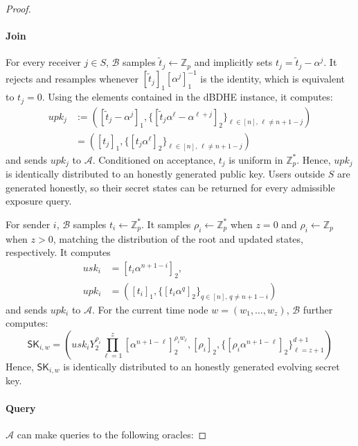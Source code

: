 \documentclass[sigconf,anonymous]{acmart}
\theoremstyle{definition}
\theoremstyle{definition}
\theoremstyle{definition}
\theoremstyle{definition}
\theoremstyle{definition}
\theoremstyle{definition}
\theoremstyle{definition}
\theoremstyle{definition}
\theoremstyle{definition}
\begin{document}
\begin{proof}
	\paragraph{\textbf{Join}}
	For every receiver $j\in S$, $\mathcal{B}$ samples
	$\widetilde{t}_j\leftarrow\mathbb{Z}_p$ and implicitly sets
	$t_j=\widetilde{t}_j-\alpha^j$. It rejects and resamples whenever
	$[\widetilde t_j]_1[\alpha^j]_1^{-1}$ is the identity, which is
	equivalent to $t_j=0$.
	Using the elements contained in the dBDHE instance, it computes:
	\begin{equation*}
		\begin{split}
			upk_j
			&:=
			\left(
			[\widetilde{t}_j-\alpha^j]_1,
			\{
			[\widetilde{t}_j\alpha^\ell-\alpha^{\ell+j}]_2
			\}_{\ell\in[n],\,\ell\neq n+1-j}
			\right)
			\\
			&=
			\left(
			[t_j]_1,
			\{
			[t_j\alpha^\ell]_2
			\}_{\ell\in[n],\,\ell\neq n+1-j}
			\right)
		\end{split}
	\end{equation*}
	and sends $upk_j$ to $\mathcal{A}$.
	Conditioned on acceptance, $t_j$ is uniform in $\mathbb{Z}_p^*$.
	Hence, $upk_j$ is identically distributed to an honestly generated
	public key. Users outside $S$ are generated honestly, so their secret
	states can be returned for every admissible exposure query.
	
	For sender $i$, $\mathcal{B}$ samples $t_i\leftarrow\mathbb{Z}_p^{*}$.
	It samples $\rho_i\leftarrow\mathbb{Z}_p^*$ when $z=0$ and
	$\rho_i\leftarrow\mathbb{Z}_p$ when $z>0$, matching the distribution
	of the root and updated states, respectively.
	It computes
	\[
	\begin{aligned}
	usk_i&=[t_i\alpha^{n+1-i}]_2,\\
	upk_i&=\left([t_i]_1,
	\{[t_i\alpha^q]_2\}_{q\in[n],\,q\neq n+1-i}\right)
	\end{aligned}
	\]
	and sends $upk_i$ to $\mathcal{A}$.
	For the current time node $w=(w_1,\ldots,w_z)$,
	$\mathcal{B}$ further computes:
	\[
	\mathsf{SK}_{i,w}
	=
	\left(
	usk_iY_2^{\rho_i}
	\prod_{\ell=1}^{z}
	[\alpha^{n+1-\ell}]_2^{\rho_iw_\ell},
	[\rho_i]_2,
	\{[\rho_i\alpha^{n+1-\ell}]_2\}_{\ell=z+1}^{d+1}
	\right)
	\]
	Hence, $\mathsf{SK}_{i,w}$ is identically distributed to an honestly
	generated evolving secret key.
	
	\paragraph{\textbf{Query}}
	$\mathcal{A}$ can make queries to the following oracles:
	

\end{proof}
\end{document}

